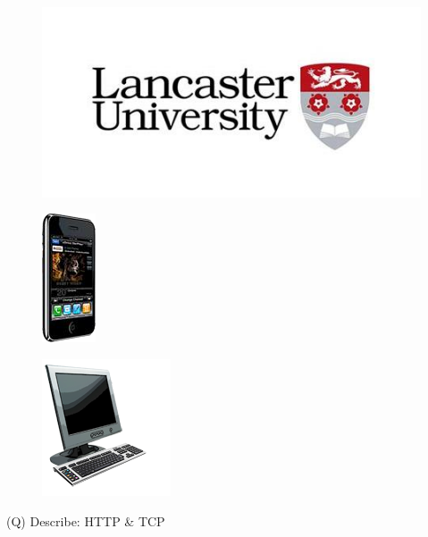 \documentclass[12pt]{article}
\begin{document}
\begin{figure}[H]
\includegraphics[width=0.5\linewidth]{page22-image-2.png}
\end{figure}
\begin{figure}[H]
\includegraphics[width=0.5\linewidth]{page22-image-3.png}
\end{figure}
\begin{figure}[H]
\includegraphics[width=0.5\linewidth]{page22-image-4.png}
\end{figure}
\clearpage
(Q)
Describe: HTTP \& TCP
\clearpage
\end{document}
